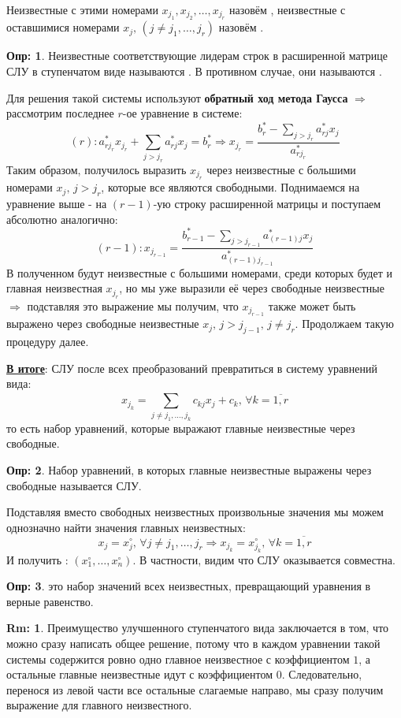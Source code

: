 \documentclass[12pt]{article}
\theoremstyle{definition}
\newtheorem{defn}{Опр:}
\newtheorem{rem}{Rm:}
\newcommand{\ddsum}[2]{\displaystyle\sum\limits_{#1}^{#2}}
\begin{document}
Неизвестные с этими номерами $x_{j_1}, x_{j_2}, \dotsc, x_{j_r}$ назовём , неизвестные с оставшимися номерами $x_j, \, (j \neq j_1, \dotsc, j_r)$ назовём .

\begin{defn}
	Неизвестные соответствующие лидерам строк в расширенной матрице СЛУ в ступенчатом виде называются . В противном случае, они называются .
\end{defn} 

Для решения такой системы используют \textbf{обратный ход метода Гаусса} $\Rightarrow$ рассмотрим последнее $r$-ое уравнение в системе:
$$
	(r) \colon a^*_{rj_r}x_{j_r} + \sum\limits_{j > j_r} a_{rj}^* x_j = b_r^{*} \Rightarrow x_{j_r} = \dfrac{ b_r^* - \sum\limits_{j > j_r} a_{rj}^* x_j }{a_{rj_r}^*}
$$
Таким образом, получилось выразить $x_{j_r}$ через неизвестные с большими номерами $x_j, \, j > j_r$, которые все являются свободными. Поднимаемся на уравнение выше - на $(r-1)$-ую строку расширенной матрицы и поступаем абсолютно аналогично:
$$
	(r-1) \colon x_{j_{r-1}} =  \dfrac{ b_{r-1}^* - \sum\limits_{j > j_{r-1}} a_{(r-1)j}^* x_j }{a_{(r-1)j_{r-1}}^*}
$$
В полученном будут неизвестные с большими номерами, среди которых будет и главная неизвестная $x_{j_r}$, но мы уже выразили её через свободные неизвестные $\Rightarrow$ подставляя это выражение мы получим, что $x_{j_{r-1}}$ также может быть выражено через свободные неизвестные $x_j, \, j > j_{j-1}, \, j \neq j_r$. Продолжаем такую процедуру далее. 

\uline{\textbf{В итоге}}: СЛУ после всех преобразований превратиться в систему уравнений вида:
$$
	x_{j_k} = \ddsum{j \neq j_1, \dotsc, j_k}{} c_{kj} x_j + c_k, \, \forall k = \overline{1,r}
$$
то есть набор уравнений, которые выражают главные неизвестные через свободные.
\begin{defn}
	Набор уравнений, в которых главные неизвестные выражены через свободные называется  СЛУ.
\end{defn} 
Подставляя вместо свободных неизвестных произвольные значения мы можем однозначно найти значения главных неизвестных: 
$$
	x_j = x_j^{\circ}, \, \forall j \neq j_1, \dotsc, j_r \Rightarrow x_{j_k} = x_{j_k}^{\circ}, \, \forall k = \overline{1,r}
$$ 
И получить : $(x_1^{\circ}, \dotsc, x_n^{\circ} )$. В частности, видим что СЛУ оказывается совместна.
\begin{defn}
	 это набор значений всех неизвестных, превращающий уравнения в верные равенство.
\end{defn}
\begin{rem}
	Преимущество улучшенного ступенчатого вида заключается в том, что можно сразу написать общее решение, потому что в каждом уравнении такой системы содержится ровно одно главное неизвестное с коэффициентом $1$, а остальные главные неизвестные идут с коэффициентом $0$. Следовательно, перенося из левой части все остальные слагаемые направо, мы сразу получим выражение для главного неизвестного. 
\end{rem}
\end{document}
